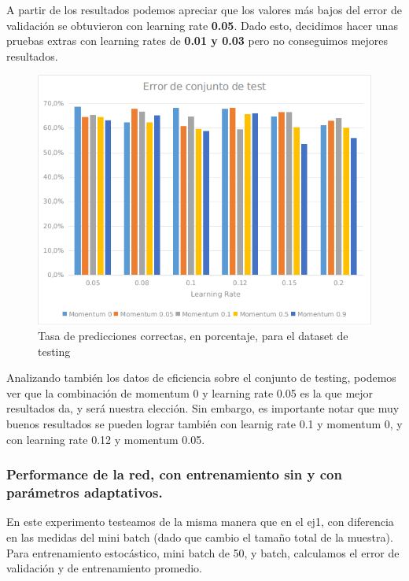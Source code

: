 A partir de los resultados podemos apreciar que los valores más bajos del error de validación se obtuvieron con learning rate \textbf{0.05}. Dado esto,
decidimos hacer unas pruebas extras con learning rates de \textbf{0.01 y 0.03} pero no conseguimos mejores resultados. 

\begin{figure}[!htbp]
  \begin{center}
  \includegraphics[scale=1]{graficos/ej2/error_testing_eta_x_momentum.png}
  \caption{Tasa de predicciones correctas, en porcentaje, para el dataset de testing}
  \end{center}
\end{figure}

Analizando también los datos de eficiencia sobre el conjunto de testing, podemos ver que la combinación de momentum 0 y learning rate 0.05 es la que 
mejor resultados da, y será nuestra elección. Sin embargo, es importante notar que muy buenos resultados se pueden lograr también con learnig rate 
0.1 y momentum 0, y con learning rate 0.12 y momentum 0.05.

\subsubsection{Performance de la red, con entrenamiento sin y con parámetros adaptativos.}

En este experimento testeamos de la misma manera que en el ej1, con diferencia en las medidas del mini batch (dado que cambio el tamaño total de la muestra). 
Para entrenamiento estocástico, mini batch de 50, y batch, calculamos el error de validación y de entrenamiento promedio.

